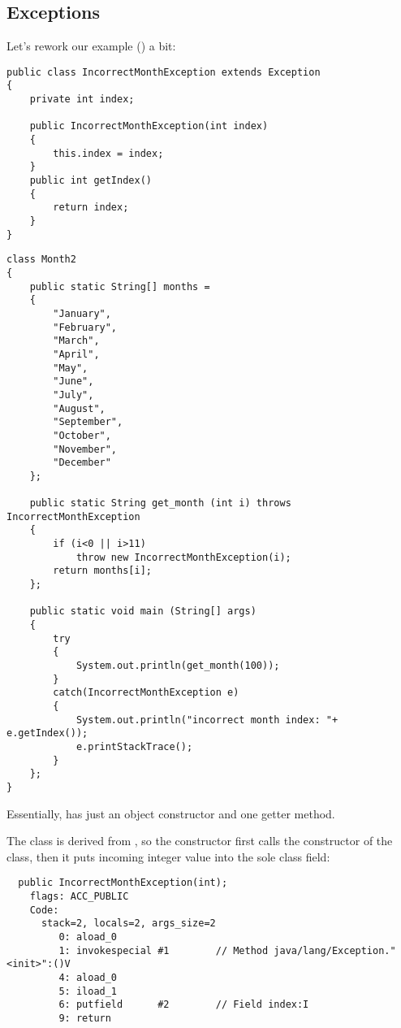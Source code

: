 \subsection{Exceptions}

Let's rework our  example () a bit:

\begin{lstlisting}[caption=IncorrectMonthException.java]
public class IncorrectMonthException extends Exception
{
	private int index;

	public IncorrectMonthException(int index)
	{
		this.index = index;
	} 
	public int getIndex()
	{
		return index;
	}
}
\end{lstlisting}

\begin{lstlisting}[caption=Month2.java]
class Month2
{
	public static String[] months = 
	{
		"January", 
		"February", 
		"March", 
		"April",
		"May",
		"June",
		"July",
		"August",
		"September",
		"October",
		"November",
		"December"
	};

	public static String get_month (int i) throws IncorrectMonthException
	{
		if (i<0 || i>11)
			throw new IncorrectMonthException(i);
		return months[i];
	};

	public static void main (String[] args)
	{
		try
		{
			System.out.println(get_month(100));
		}
		catch(IncorrectMonthException e)
		{
			System.out.println("incorrect month index: "+ e.getIndex());
			e.printStackTrace();
		}
	};
}
\end{lstlisting}

Essentially,  has just an object constructor 
and one getter method.

The  class is derived from , 
so the  constructor
first calls the constructor of the  class, 
then it puts incoming integer value into the sole  class field:

\begin{lstlisting}
  public IncorrectMonthException(int);
    flags: ACC_PUBLIC
    Code:
      stack=2, locals=2, args_size=2
         0: aload_0       
         1: invokespecial #1        // Method java/lang/Exception."<init>":()V
         4: aload_0       
         5: iload_1       
         6: putfield      #2        // Field index:I
         9: return        
\end{lstlisting}

